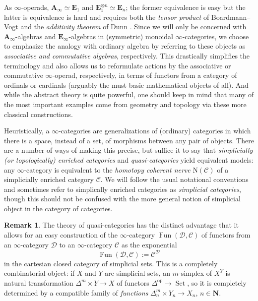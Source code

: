 \documentclass[12pt]{article}
\theoremstyle{definition}
\newtheorem{remark}{Remark}[subsection]
\newcommand{\C}{\mathcal{C}}
\newcommand{\D}{\mathcal{D}}
\renewcommand{\AA}{\mathbf{A}}
\newcommand{\EE}{\mathbf{E}}
\newcommand{\NN}{\mathbf{N}}
\renewcommand{\i}{\infty}
\newcommand{\op}{\mathrm{op}}
\DeclareMathOperator{\Fun}{Fun}
\DeclareMathOperator{\Set}{Set}
\begin{document}
As $\i$-operads, $\AA_\i\simeq\EE_1$ and $\EE_1^{\otimes n}\simeq\EE_n$; the former equivalence is easy but the latter is equivalence is hard and requires both the {\em tensor product} of Boardmann--Vogt \cite{BV} and the  {\em additivity theorem} of Dunn \cite{Dunn}.
Since we will only be concerned with $\AA_\i$-algebras and $\EE_\i$-algebras in (symmetric) monoidal $\i$-categories, we choose to emphasize the analogy with ordinary algebra by referring to these objects as {\em associative and commutative algebras}, respectively.
This drastically simplifies the terminology and also allows us to reformulate actions by the associative or commutative $\i$-operad, respectively, in terms of functors from a category of ordinals or cardinals (arguably the must basic mathematical objects of all).
And while the abstract theory is quite powerful, one should keep in mind that many of the most important examples come from geometry and topology via these more classical constructions.



Heuristically, a $\infty$-categories are generalizations of (ordinary) categories in which there is a space, instead of a set, of morphisms between any pair of objects.
There are a number of ways of making this precise, but suffice it to say that {\em simplicially (or topologically) enriched categories} and {\em quasi-categories} yield equivalent models:
any $\infty$-category is equivalent to the {\em homotopy coherent nerve} $\mathrm{N}(\C)$ of a simplicially enriched category $\C$.
We will follow the usual notational conventions and sometimes refer to simplically enriched categories as {\em simplicial categories}, though this should not be confused with the more general notion of simplicial object in the category of categories.
\begin{remark}
The theory of quasi-categories \cite{Joy} has the distinct advantage that it allows for an easy construction of the $\i$-category $\Fun(\D,\C)$ of functors from an $\infty$-category $\D$ to an $\i$-category $\C$ as the exponential
\index{$\Fun(\D,\C)$}
\[
\Fun(\D,\C):=\C^{\D}
\]
in the cartesian closed category of simplicial sets.
This is a completely combinatorial object: if $X$ and $Y$ are simplicial sets, an $m$-simplex of $X^Y$ is natural transformation $\Delta^m\times Y\to X$ of functors $\Delta^{\op}\to\Set$, so it is completely determined by a compatible family of {\em functions} $\Delta^m_n\times Y_n\to X_n$, $n\in\NN$.
\end{remark}
\end{document}
